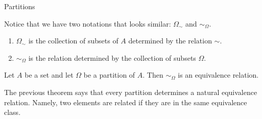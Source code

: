 \begin{section}{Partitions}
\begin{remark}
Notice that we have two notations that looks similar: \(\Omega_{\sim}\) and \(\sim_{\Omega}\).  
\begin{enumerate}
\item \(\Omega_{\sim}\) is the collection of subsets of \(A\) determined by the relation \(\sim\).
\item \(\sim_{\Omega}\) is the relation determined by the collection of subsets \(\Omega\).
\end{enumerate}
\end{remark}

\begin{theorem}
Let \(A\) be a set and let \(\Omega\) be a partition of \(A\).  Then \(\sim_{\Omega}\) is an equivalence relation.
\end{theorem}

\begin{remark}
The previous theorem says that every partition determines a natural equivalence relation.  Namely, two elements are related if they are in the same equivalence class.
\end{remark}

\end{section}

